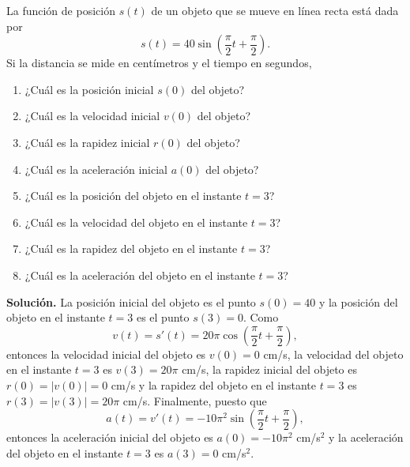 \documentclass[12pt,a4paper]{book}
\begin{document}
    \begin{ejemplo}\label{ejm:85}
        La función
        de posición $s(t)$ de un objeto que se mueve en línea recta está dada
        por
        \begin{equation*}
            s(t)=40\sin\left(\frac{\pi}{2}t+\frac{\pi}{2}\right).
        \end{equation*}
        Si la distancia se mide en centímetros y el tiempo en segundos,
        \begin{enumerate}[nosep]
            \item ¿Cuál es la posición inicial $s(0)$ del objeto?
            \item ¿Cuál es la velocidad inicial $v(0)$ del objeto?
            \item ¿Cuál es la rapidez inicial $r(0)$ del objeto?
            \item ¿Cuál es la aceleración inicial $a(0)$ del objeto?
            \item ¿Cuál es la posición del objeto en el instante $t=3$?
            \item ¿Cuál es la velocidad del objeto en el instante $t=3$?
            \item ¿Cuál es la rapidez del objeto en el instante $t=3$?
            \item ¿Cuál es la aceleración del objeto en el instante $t=3$?
        \end{enumerate}

        \textbf{Solución.} La posición inicial del objeto es el punto $s(0)=40$ y la posición
        del objeto en el instante $t=3$ es el punto $s(3)=0$. Como
        \begin{equation*}
            v(t)=s'(t)=20\pi\cos\left(\frac{\pi}{2}t+\frac{\pi}{2}\right),
        \end{equation*}
        entonces la velocidad inicial del objeto es $v(0)=0$ cm/s, la velocidad del
        objeto en el instante $t=3$ es $v(3)=20\pi$ cm/s, la rapidez inicial del objeto
        es $r(0)=|v(0)|=0$ cm/s y la rapidez del objeto en el instante $t=3$ es
        $r(3)=|v(3)|=20\pi$ cm/s. Finalmente, puesto que
        \begin{equation*}
            a(t)=v'(t)=-10\pi^{2}\sin\left(\frac{\pi}{2}t+\frac{\pi}{2}\right),
        \end{equation*}
        entonces la aceleración inicial del objeto es $a(0)=-10\pi^{2}$ cm/s$^{2}$ y la aceleración
        del objeto en el instante $t=3$ es $a(3)=0$ cm/s$^{2}$.
    \end{ejemplo}
\end{document}
